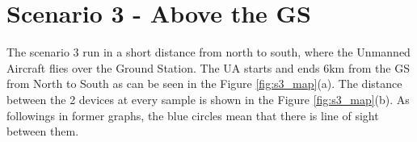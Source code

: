 \newpage
\section{Scenario 3 - Above the GS}\label{sec:scenario3}
The scenario 3 run in a short distance from north to south, where the Unmanned Aircraft flies over the Ground Station. The UA starts and ends 6km from the GS from North to South as can be seen in the Figure \ref{fig:s3_map}(a). The distance between the 2 devices at every sample is shown in the Figure \ref{fig:s3_map}(b). As followings in former graphs, the blue circles mean that there is line of sight between them. 


\begin{figure}[H]
	\centering

\end{figure}
